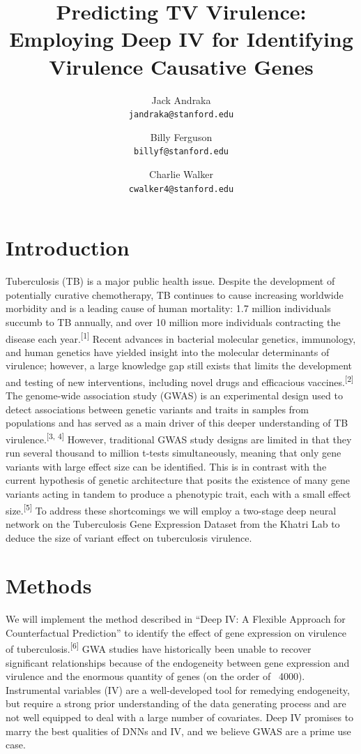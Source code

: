 \documentclass[11pt, oneside]{article}   	%
\title{Predicting TV Virulence: Employing Deep IV for Identifying Virulence Causative Genes}
\author{
	Jack Andraka\\ 
	\texttt{jandraka@stanford.edu}
	\and
	Billy Ferguson\\
	\texttt{billyf@stanford.edu}
	\and
	Charlie Walker\\
	\texttt{cwalker4@stanford.edu}
}
\date{}							%
\begin{document}
\maketitle
\section{Introduction}

\indent Tuberculosis (TB) is a major public health issue. Despite the development of potentially curative chemotherapy, TB continues to cause increasing worldwide morbidity and is a leading cause of human mortality: 1.7 million individuals succumb to TB annually, and over 10 million more individuals contracting the disease each year.\textsuperscript{[1]} Recent advances in bacterial molecular genetics, immunology, and human genetics have yielded insight into the molecular determinants of virulence; however, a large knowledge gap still exists that limits the development and testing of new interventions, including novel drugs and efficacious vaccines.\textsuperscript{[2]}\\

 The genome-wide association study (GWAS) is an experimental design used to detect associations between genetic variants and traits in samples from populations and has served as a main driver of this deeper understanding of TB virulence.\textsuperscript{[3, 4]} However, traditional GWAS study designs are limited in that they run several thousand to million t-tests simultaneously, meaning that only gene variants with large effect size can be identified. This is in contrast with the current hypothesis of genetic architecture that posits the existence of many gene variants acting in tandem to produce a phenotypic trait, each with a small effect size.\textsuperscript{[5]} To address these shortcomings we will employ a two-stage deep neural network on the Tuberculosis Gene Expression Dataset from the Khatri Lab to deduce the size of variant effect on tuberculosis virulence. 

\section{Methods}
We will implement the method described in ``Deep IV: A Flexible Approach for Counterfactual Prediction'' to identify the effect of gene expression on virulence of tuberculosis.\textsuperscript{[6]} GWA studies have historically been unable to recover significant relationships because of the endogeneity between gene expression and virulence and the enormous quantity of genes (on the order of ~4000). Instrumental variables (IV) are a well-developed tool for remedying endogeneity, but require a strong prior understanding of the data generating process and are not well equipped to deal with a large number of covariates. Deep IV promises to marry the best qualities of DNNs and IV, and we believe GWAS are a prime use case. \\
\end{document}
